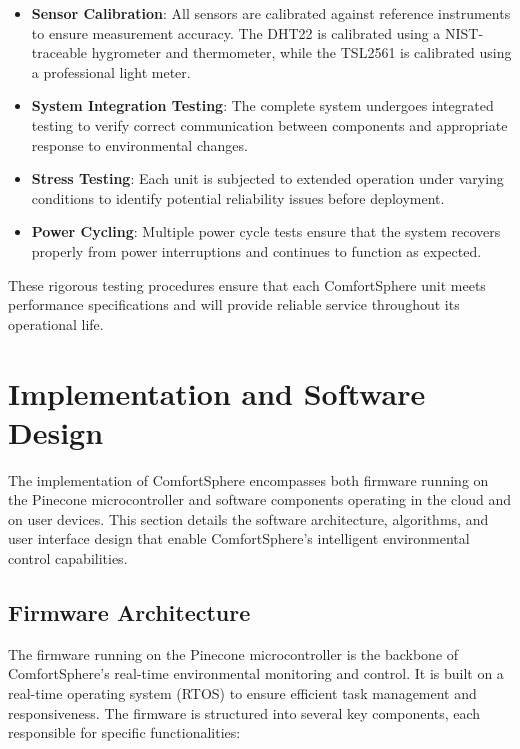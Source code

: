 \documentclass[a4paper]{scrartcl}
\begin{document}
    \begin{itemize}
        \item \textbf{Sensor Calibration}: All sensors are calibrated against reference instruments to ensure measurement accuracy. The DHT22 is calibrated using a NIST-traceable hygrometer and thermometer, while the TSL2561 is calibrated using a professional light meter.
        \item \textbf{System Integration Testing}: The complete system undergoes integrated testing to verify correct communication between components and appropriate response to environmental changes.
        \item \textbf{Stress Testing}: Each unit is subjected to extended operation under varying conditions to identify potential reliability issues before deployment.
        \item \textbf{Power Cycling}: Multiple power cycle tests ensure that the system recovers properly from power interruptions and continues to function as expected.
    \end{itemize}
    
    These rigorous testing procedures ensure that each ComfortSphere unit meets performance specifications and will provide reliable service throughout its operational life.

	\section{Implementation and Software Design}
	\label{sec:implementation}
	The implementation of ComfortSphere encompasses both firmware running on the Pinecone microcontroller and software components operating in the cloud and on user devices. This section details the software architecture, algorithms, and user interface design that enable ComfortSphere's intelligent environmental control capabilities.
	
\subsection{Firmware Architecture}
The firmware running on the Pinecone microcontroller is the backbone of ComfortSphere's real-time environmental monitoring and control. It is built on a real-time operating system (RTOS) to ensure efficient task management and responsiveness. The firmware is structured into several key components, each responsible for specific functionalities:
\end{document}
